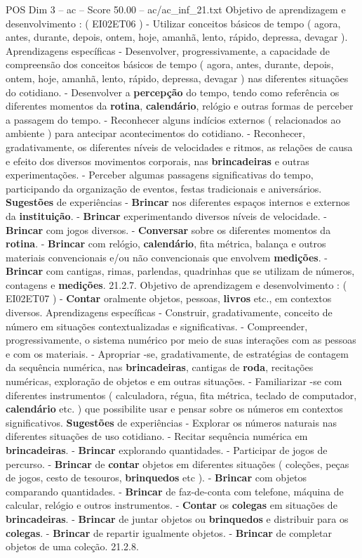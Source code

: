 \begin{textsample}{POS Dim 3 – ac – Score 50.00 – ac/ac\_inf\_21.txt}
Objetivo de aprendizagem e desenvolvimento : ( EI02ET06 ) - Utilizar conceitos básicos de tempo ( agora, antes, durante, depois, ontem, hoje, amanhã, lento, rápido, depressa, devagar ).
Aprendizagens específicas - Desenvolver, progressivamente, a capacidade de compreensão dos conceitos básicos de tempo ( agora, antes, durante, depois, ontem, hoje, amanhã, lento, rápido, depressa, devagar ) nas diferentes situações do cotidiano. - Desenvolver a \textbf{percepção} do tempo, tendo como referência os diferentes momentos da \textbf{rotina}, \textbf{calendário}, relógio e outras formas de perceber a passagem do tempo. - Reconhecer alguns indícios externos ( relacionados ao ambiente ) para antecipar acontecimentos do cotidiano. - Reconhecer, gradativamente, os diferentes níveis de velocidades e ritmos, as relações de causa e efeito dos diversos movimentos corporais, nas \textbf{brincadeiras} e outras experimentações. - Perceber algumas passagens significativas do tempo, participando da organização de eventos, festas tradicionais e aniversários. \textbf{Sugestões} de experiências - \textbf{Brincar} nos diferentes espaços internos e externos da \textbf{instituição}. - \textbf{Brincar} experimentando diversos níveis de velocidade. - \textbf{Brincar} com jogos diversos. - \textbf{Conversar} sobre os diferentes momentos da \textbf{rotina}. - \textbf{Brincar} com relógio, \textbf{calendário}, fita métrica, balança e outros materiais convencionais e/ou não convencionais que envolvem \textbf{medições}. - \textbf{Brincar} com cantigas, rimas, parlendas, quadrinhas que se utilizam de números, contagens e \textbf{medições}. 21.2.7.
Objetivo de aprendizagem e desenvolvimento : ( EI02ET07 ) - \textbf{Contar} oralmente objetos, pessoas, \textbf{livros} etc., em contextos diversos.
Aprendizagens específicas - Construir, gradativamente, conceito de número em situações contextualizadas e significativas. - Compreender, progressivamente, o sistema numérico por meio de suas interações com as pessoas e com os materiais. - Apropriar -se, gradativamente, de estratégias de contagem da sequência numérica, nas \textbf{brincadeiras}, cantigas de \textbf{roda}, recitações numéricas, exploração de objetos e em outras situações. - Familiarizar -se com diferentes instrumentos ( calculadora, régua, fita métrica, teclado de computador, \textbf{calendário} etc. ) que possibilite usar e pensar sobre os números em contextos significativos. \textbf{Sugestões} de experiências - Explorar os números naturais nas diferentes situações de uso cotidiano. - Recitar sequência numérica em \textbf{brincadeiras}. - \textbf{Brincar} explorando quantidades. - Participar de jogos de percurso. - \textbf{Brincar} de \textbf{contar} objetos em diferentes situações ( coleções, peças de jogos, cesto de tesouros, \textbf{brinquedos} etc ). - \textbf{Brincar} com objetos comparando quantidades. - \textbf{Brincar} de faz-de-conta com telefone, máquina de calcular, relógio e outros instrumentos. - \textbf{Contar} os \textbf{colegas} em situações de \textbf{brincadeiras}. - \textbf{Brincar} de juntar objetos ou \textbf{brinquedos} e distribuir para os \textbf{colegas}. - \textbf{Brincar} de repartir igualmente objetos. - \textbf{Brincar} de completar objetos de uma coleção. 21.2.8.

\end{textsample}
